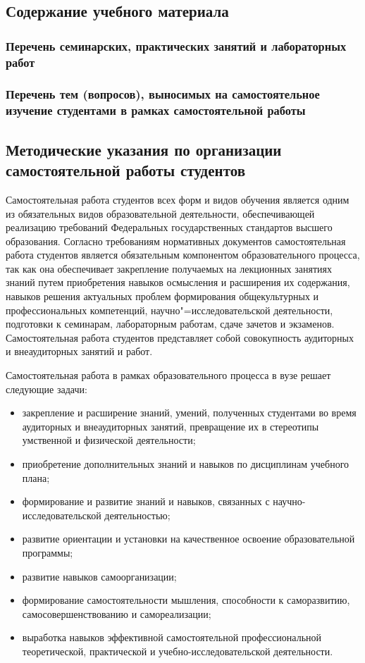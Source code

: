 \documentclass[12pt]{scrartcl}
\begin{document}
\subsection{Содержание учебного материала}

\subsubsection{Перечень семинарских, практических занятий и лабораторных работ}

\subsubsection{Перечень тем (вопросов), выносимых на самостоятельное изучение студентами
в рамках самостоятельной работы}

\subsection{Методические указания по организации самостоятельной работы студентов}

Самостоятельная работа студентов всех форм и видов обучения является одним из
обязательных видов образовательной деятельности, обеспечивающей реализацию
требований Федеральных государственных стандартов высшего образования. Согласно
требованиям нормативных документов самостоятельная работа студентов является
обязательным компонентом образовательного процесса, так как она обеспечивает
закрепление получаемых на лекционных занятиях знаний путем приобретения навыков
осмысления и расширения их содержания, навыков решения актуальных проблем
формирования общекультурных и профессиональных компетенций, научно"=исследовательской деятельности, подготовки к семинарам, лабораторным работам, сдаче
зачетов и экзаменов. Самостоятельная работа студентов представляет собой совокупность
аудиторных и внеаудиторных занятий и работ.

Самостоятельная работа в рамках
образовательного процесса в вузе решает следующие задачи:
\begin{itemize}
\item закрепление и расширение знаний, умений, полученных студентами во время
аудиторных и внеаудиторных занятий, превращение их в стереотипы умственной и
физической деятельности;
\item приобретение дополнительных знаний и навыков по дисциплинам учебного плана;
\item формирование и развитие знаний и навыков, связанных с научно-исследовательской
деятельностью;
\item развитие ориентации и установки на качественное освоение образовательной
программы;
\item развитие навыков самоорганизации;
\item формирование самостоятельности мышления, способности к саморазвитию,
самосовершенствованию и самореализации;
\item выработка навыков эффективной самостоятельной профессиональной теоретической,
  практической и учебно-исследовательской деятельности.
\end{itemize}
\end{document}
